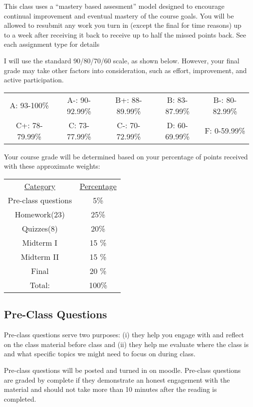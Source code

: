 \documentclass[11pt]{article}
\begin{document}
This class uses a ``mastery based assesment'' model designed to encourage continual improvement and eventual mastery of the course goals. You will be allowed to resubmit any work you turn in (except the final for time reasons) up to a week after receiving it back to receive up to half the missed points back. See each assignment type for details

I will use the standard 90/80/70/60 scale, as shown below. However, your final grade may take other factors into consideration, such as effort, improvement, and active participation.

\begin{center}
  \begin{tabular}{ccccc}
     A: 93-100\% & A-: 90-92.99\% & B+: 88-89.99\% & B: 83-87.99\% & B-: 80-82.99\% 
     \\
     C+: 78-79.99\% & C: 73-77.99\% & C-: 70-72.99\% & D: 60-69.99\%	&  F: 0-59.99\%
  \end{tabular}
\end{center}

Your course grade will be determined based on your percentage of points received with these approximate weights:

\begin{center}
	\begin{tabular}{cc}
		\underline{Category} & \underline{Percentage}
	    \\
		Pre-class questions	 & 5\%
		\\
		Homework(23)	 & 25\%
		\\
		Quizzes(8)	 & 20\%
		\\
		Midterm	I & 15 \%
		\\
		Midterm	II & 15 \%
		\\
		Final   	& 20 \%
		\\
		\hline
		Total: & 100\%
	\end{tabular}
\end{center}

\subsection*{Pre-Class Questions}

Pre-class questions serve two purposes: (i) they help you engage with and reflect on the class material before class and (ii) they help me evaluate where the class is and what specific topics we might need to focus on during class.

Pre-class questions will be posted and turned in on moodle. Pre-class questions are graded by complete if they demonstrate an honest engagement with the material and should not take more than 10 minutes after the reading is completed.
\end{document}
